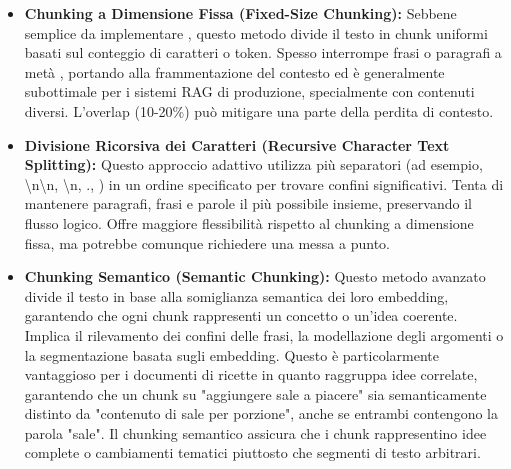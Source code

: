 \documentclass[a4paper, 11pt]{article}
\begin{document}
\begin{itemize}
    \item \textbf{Chunking a Dimensione Fissa (Fixed-Size Chunking):} Sebbene semplice da implementare \cite{f22_chunking_strategies}, questo metodo divide il testo in chunk uniformi basati sul conteggio di caratteri o token. \cite{chunking_strategies_ibm} Spesso interrompe frasi o paragrafi a metà \cite{semantic_chunking_ani}, portando alla frammentazione del contesto ed è generalmente subottimale per i sistemi RAG di produzione, specialmente con contenuti diversi. \cite{databricks_unstructured_data} L'overlap (10-20\%) può mitigare una parte della perdita di contesto. \cite{semantic_chunking_multimodal}
    \item \textbf{Divisione Ricorsiva dei Caratteri (Recursive Character Text Splitting):} Questo approccio adattivo utilizza più separatori (ad esempio, \textbackslash n\textbackslash n, \textbackslash n, ., ) in un ordine specificato per trovare confini significativi. \cite{chunking_strategies_ibm} Tenta di mantenere paragrafi, frasi e parole il più possibile insieme, preservando il flusso logico. \cite{chunking_strategies_ibm} Offre maggiore flessibilità rispetto al chunking a dimensione fissa, ma potrebbe comunque richiedere una messa a punto. \cite{semantic_chunking_ani}
    \item \textbf{Chunking Semantico (Semantic Chunking):} Questo metodo avanzato divide il testo in base alla somiglianza semantica dei loro embedding, garantendo che ogni chunk rappresenti un concetto o un'idea coerente. \cite{semantic_chunking_multimodal} Implica il rilevamento dei confini delle frasi, la modellazione degli argomenti o la segmentazione basata sugli embedding. \cite{semantic_chunking_ani} Questo è particolarmente vantaggioso per i documenti di ricette in quanto raggruppa idee correlate, garantendo che un chunk su "aggiungere sale a piacere" sia semanticamente distinto da "contenuto di sale per porzione", anche se entrambi contengono la parola "sale". \cite{semantic_chunking_multimodal} Il chunking semantico assicura che i chunk rappresentino idee complete o cambiamenti tematici piuttosto che segmenti di testo arbitrari.

\end{itemize}
\end{document}
